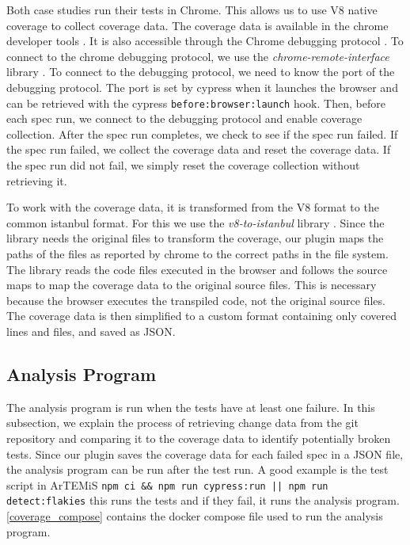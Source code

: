 Both case studies run their tests in Chrome.
This allows us to use V8 native coverage to collect coverage data.
The coverage data is available in the chrome developer tools \autocite{kayce_basques_coverage_2020}.
It is also accessible through the Chrome debugging protocol \autocite{noauthor_chrome_nodate}.
To connect to the chrome debugging protocol, we use the \emph{chrome-remote-interface} library \autocite{cardaci_chrome-remote-interface_2023}.
To connect to the debugging protocol, we need to know the port of the debugging protocol.
The port is set by cypress when it launches the browser and can be retrieved with the cypress \texttt{before:browser:launch} hook.
Then, before each spec run, we connect to the debugging protocol and enable coverage collection.
After the spec run completes, we check to see if the spec run failed.
If the spec run failed, we collect the coverage data and reset the coverage data.
If the spec run did not fail, we simply reset the coverage collection without retrieving it.

To work with the coverage data, it is transformed from the V8 format to the common istanbul format.
For this we use the \emph{v8-to-istanbul} library \autocite{noauthor_v8--istanbul_2023}.
Since the library needs the original files to transform the coverage, our plugin maps the paths of the files as reported by chrome to the correct paths in the file system.
The library reads the code files executed in the browser and follows the source maps to map the coverage data to the original source files.
This is necessary because the browser executes the transpiled code, not the original source files.
The coverage data is then simplified to a custom format containing only covered lines and files, and saved as JSON.

\subsection{Analysis Program}
The analysis program is run when the tests have at least one failure.
In this subsection, we explain the process of retrieving change data from the git repository and comparing it to the coverage data to identify potentially broken tests.
Since our plugin saves the coverage data for each failed spec in a JSON file, the analysis program can be run after the test run.
A good example is the test script in ArTEMiS \texttt{npm ci \&\& npm run cypress:run || npm run detect:flakies} this runs the tests and if they fail, it runs the analysis program.
\cref{coverage_compose} contains the docker compose file used to run the analysis program.

